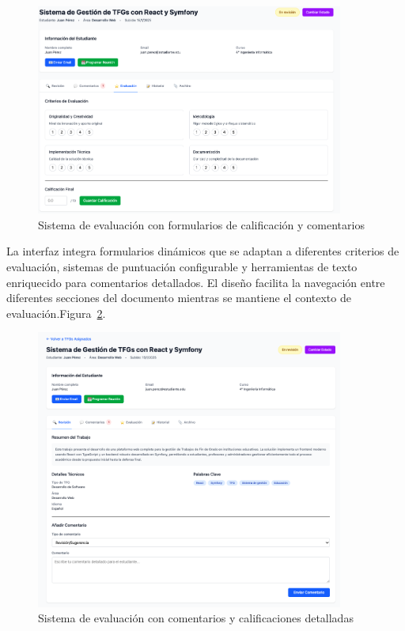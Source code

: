 \documentclass[12pt,a4paper,oneside]{report}
\begin{document}
\begin{figure}[H]
\centering
\includegraphics[width=0.9\textwidth]{processed/images/sistema_evaluacion.png}
\caption{Sistema de evaluación con formularios de calificación y comentarios}
\label{fig:sistema-evaluacion}
\end{figure}

La interfaz integra formularios dinámicos que se adaptan a diferentes criterios de evaluación, sistemas de puntuación configurable y herramientas de texto enriquecido para comentarios detallados. El diseño facilita la navegación entre diferentes secciones del documento mientras se mantiene el contexto de evaluación.Figura~\ref{fig:sistema-evaluacion-comentarios}.

\begin{figure}[H]
\centering
\includegraphics[width=0.9\textwidth]{processed/images/sistema_evaluacion_comentarios.png}
\caption{Sistema de evaluación con comentarios y calificaciones detalladas}
\label{fig:sistema-evaluacion-comentarios}
\end{figure}
\end{document}
